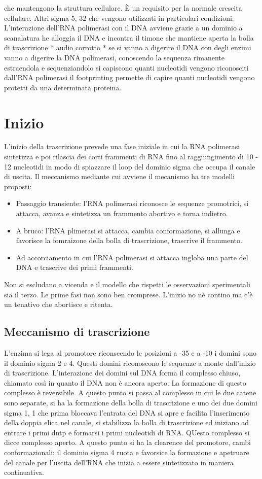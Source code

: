che mantengono la struttura cellulare. \`E un requisito per la normale crescita cellulare. Altri sigma 5, 32 che vengono utilizzati in particolari condizioni. L'interazione dell'RNA 
polimerasi con il DNA avviene grazie a un dominio a scanalatura he alloggia il DNA e incontra il timone che mantiene aperta la bolla di trascrizione * audio corrotto * se si vanno a 
digerire il DNA con degli enzimi vanno a digerire la DNA polimerasi, conoscendo la sequenza rimanente estraendola e sequenziandolo si capiscono quanti nucleotidi vengono riconosciti 
dall'RNA polimerasi il footprinting permette di capire quanti nucleotidi vengono protetti da una determinata proteina. 
\section{Inizio}
L'inizio della trascrizione prevede una fase iniziale in cui la RNA polimerasi sintetizza e poi rilascia dei corti frammenti di RNA fino al raggiungimento di 10 - 12 nucleotidi in modo 
di spiazzare il loop del dominio sigma che occupa il canale di uscita. Il meccanismo mediante cui avviene il mecanismo ha tre modelli proposti:
\begin{itemize}
	\item Passaggio transiente: l'RNA polimerasi riconosce le sequenze promotrici, si attacca, avanza e sintetizza un frammento abortivo e torna indietro.
	\item A bruco: l'RNA plimerasi si attacca, cambia conformazione, si allunga e favorisce la fomraizone della bolla di trascrizione, trascrive il frammento.
	\item Ad accorciamento in cui l'RNA polimerasi si attacca ingloba una parte del DNA e trascrive dei primi frammenti.
\end{itemize}
Non si escludano a vicenda e il modello che rispetti le osservazioni sperimentali sia il terzo. Le prime fasi non sono ben cromprese. L'inizio no n\`e contino ma c'\`e un tenativo che 
abortisce e ritenta.
\subsection{Meccanismo di trascrizione}
L'enzima si lega al promotore riconscendo le posizioni a -35 e a -10 i domini sono il dominio sigma 2 e 4. Questi domini riconoscono le sequenze a monte dall'inizio di trascrizione. 
L'interazione dei domini sul DNA forma il complesso chiuso, chiamato cos\`i in quanto il DNA non \`e ancora aperto. La formazione di questo complesso \`e reversibile. A questo punto
si passa al complesso in cui le due catene sono separate, si ha la formazione della bolla di trascrizione e uno dei due domini sigma 1, 1 che prima bloccava l'entrata del DNA si apre
e facilita l'inserimento della doppia elica nel canale, si stabilizza la bolla di trascrizione ed iniziano ad entrare i primi dntp e formarsi i primi nucleotidi di RNA. QUesto complesso
si dicce complesso aperto. A questo punto si ha la clearence del promotore, cambi conformazionali: il dominio sigma 4 ruota e favorsice la formazione e apetruare del canale per l'uscita
dell'RNA che inizia a essere sintetizzato in maniera continuativa. 
